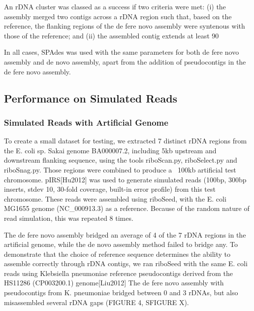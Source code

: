 \documentclass[11pt]{article}
\begin{document}
\begin{linenumbers}
An rDNA cluster was classed as a success if two criteria were met: (i) the assembly merged two contigs across a rDNA region such that, based on the reference, the flanking regions of the de fere novo assembly were syntenous with those of the reference; and (ii) the assembled contig extends at least 90%


In all cases, SPAdes was used with the same parameters for both de fere novo assembly and de novo assembly, apart from the addition of pseudocontigs in the de fere novo assembly.

\subsection*{Performance on Simulated Reads}
\subsubsection*{Simulated Reads with Artificial Genome}
To create a small dataset for testing, we extracted 7 distinct rDNA regions from the E. coli sp. Sakai genome BA000007.2, including 5kb upstream and downstream flanking sequence, using the tools riboScan.py, riboSelect.py and riboSnag.py. Those regions were combined to produce a ~100kb artificial test chromosome. pIRS[Hu2012] was used to generate simulated reads (100bp, 300bp inserts, stdev 10, 30-fold coverage, built-in error profile) from this test chromosome. These reads were assembled using riboSeed, with the E. coli MG1655 genome (NC\_000913.3) as a reference.  Because of the random nature of read simulation, this was repeated 8 times.


The de fere novo assembly bridged an average of 4 of the 7 rDNA regions in the artificial genome, while the de novo assembly method failed to bridge any. To demonstrate that the choice of reference sequence determines the ability to assemble correctly through rDNA contigs, we ran riboSeed with the same E. coli reads using Klebsiella pneumoniae reference pseudocontigs derived from the HS11286 (CP003200.1) genome[Liu2012] The de fere novo assembly with pseudocontigs from K. pneumoniae bridged between 0 and 3 rDNAs, but also misassembled  several rDNA gaps (FIGURE 4, SFIGURE X).


\end{linenumbers}
\end{document}
